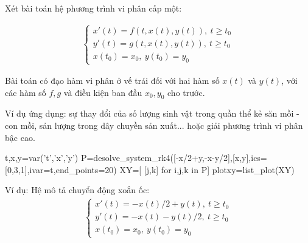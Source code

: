 \documentclass[12pt]{article}
\begin{document}

\newpage{}

Xét bài toán hệ phương trình vi phân cấp một:

\begin{align}
 \left\lbrace \begin{array}{l}
               x'(t) = f(t,x(t),y(t)), ~ t \geq t_0 \\
               y'(t) = g(t,x(t),y(t)), ~ t \geq t_0 \\
               x(t_0) = x_0, ~ y(t_0)=y_0
              \end{array}
\right.
\end{align}

Bài toán có đạo hàm vi phân ở vế trái đối với hai hàm số $x(t)$ và $y(t)$, với các hàm số $f, g$ và điều kiện ban đầu $x_0, y_0$ cho trước.

Ví dụ ứng dụng: sự thay đổi của số lượng sinh vật trong quần thể kẻ săn mồi - con mồi, sản lượng trong dây chuyền sản xuất... hoặc giải phương trình vi phân bậc cao.

\newpage{}

\begin{sagesilent}
t,x,y=var('t','x','y')
P=desolve_system_rk4([-x/2+y,-x-y/2],[x,y],ics=[0,3,1],ivar=t,end_points=20)
XY=[ [j,k] for i,j,k in P]
plotxy=list_plot(XY)
\end{sagesilent}

Ví dụ: Hệ mô tả chuyển động xoắn ốc: 
\begin{align}
 \left\lbrace \begin{array}{l}
               x'(t) = -x(t)/2 + y(t), ~ t \geq t_0 \\
               y'(t) = -x(t) - y(t)/2, ~ t \geq t_0 \\
               x(t_0) = x_0, ~ y(t_0)=y_0
              \end{array}
\right.
\end{align}
\end{document}
